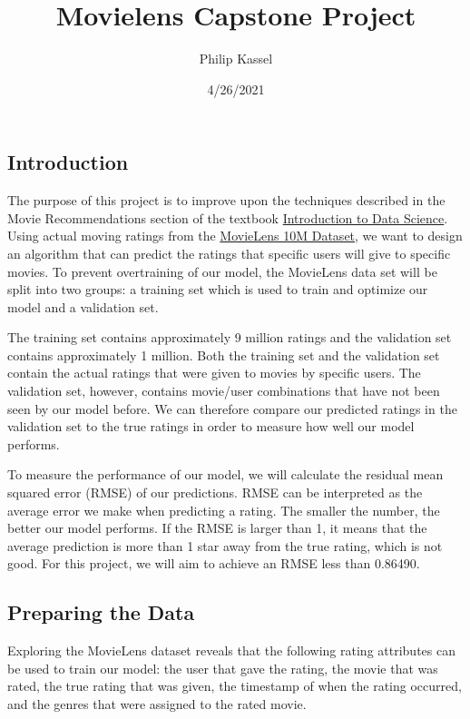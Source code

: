 \documentclass[
]{article}
\title{Movielens Capstone Project}
\author{Philip Kassel}
\date{4/26/2021}
\begin{document}
\maketitle

\hypertarget{introduction}{%
\subsection{Introduction}\label{introduction}}

The purpose of this project is to improve upon the techniques described
in the Movie Recommendations section of the textbook
\href{https://www.routledge.com/Introduction-to-Data-Science-Data-Analysis-and-Prediction-Algorithms-with/Irizarry/p/book/9780367357986}{Introduction
to Data Science}. Using actual moving ratings from the
\href{https://grouplens.org/datasets/movielens/}{MovieLens 10M Dataset},
we want to design an algorithm that can predict the ratings that
specific users will give to specific movies. To prevent overtraining of
our model, the MovieLens data set will be split into two groups: a
training set which is used to train and optimize our model and a
validation set.

The training set contains approximately 9 million ratings and the
validation set contains approximately 1 million. Both the training set
and the validation set contain the actual ratings that were given to
movies by specific users. The validation set, however, contains
movie/user combinations that have not been seen by our model before. We
can therefore compare our predicted ratings in the validation set to the
true ratings in order to measure how well our model performs.

To measure the performance of our model, we will calculate the residual
mean squared error (RMSE) of our predictions. RMSE can be interpreted as
the average error we make when predicting a rating. The smaller the
number, the better our model performs. If the RMSE is larger than 1, it
means that the average prediction is more than 1 star away from the true
rating, which is not good. For this project, we will aim to achieve an
RMSE less than 0.86490.

\hypertarget{preparing-the-data}{%
\subsection{Preparing the Data}\label{preparing-the-data}}

Exploring the MovieLens dataset reveals that the following rating
attributes can be used to train our model: the user that gave the
rating, the movie that was rated, the true rating that was given, the
timestamp of when the rating occurred, and the genres that were assigned
to the rated movie.
\end{document}
